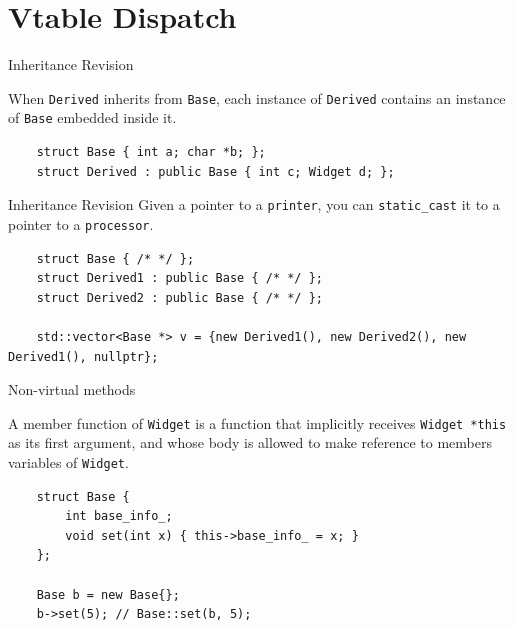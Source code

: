 \section{Vtable Dispatch}

\begin{frame}[fragile]{Inheritance Revision}
  \begin{sqt:result}
    When \texttt{Derived} inherits from \texttt{Base}, each instance of 
    \texttt{Derived} contains an instance of \texttt{Base} embedded inside it.
  \end{sqt:result}
  \begin{verbatim}
    struct Base { int a; char *b; };
    struct Derived : public Base { int c; Widget d; };
  \end{verbatim}

  \begin{center}
    
  \end{center}
\end{frame}

\begin{frame}[fragile]{Inheritance Revision}
  Given a pointer to a \texttt{printer}, you can \texttt{static\_cast} it 
  to a pointer to a \texttt{processor}.
  \begin{verbatim}
    struct Base { /* */ };
    struct Derived1 : public Base { /* */ };
    struct Derived2 : public Base { /* */ };

    std::vector<Base *> v = {new Derived1(), new Derived2(), new Derived1(), nullptr};
  \end{verbatim}
  \begin{center}
    
  \end{center}
\end{frame}

\begin{frame}[fragile]{Non-virtual methods}
  \begin{sqt:definition}
    A member function of \texttt{Widget}
    is a function that implicitly receives \texttt{Widget *this} as its first argument,
    and whose body is allowed to make reference to members variables of \texttt{Widget}.
  \end{sqt:definition}

  \begin{verbatim}
    struct Base {
        int base_info_;
        void set(int x) { this->base_info_ = x; }
    };

    Base b = new Base{};
    b->set(5); // Base::set(b, 5);
  \end{verbatim}
\end{frame}

